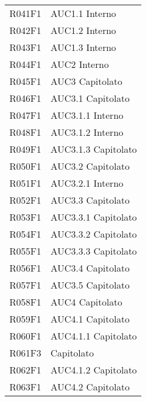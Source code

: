 \documentclass[../analisi-dei-requisiti.tex]{subfiles}
\begin{document}
\begin{longtable}[H]{ p{3cm} | p{4cm} }
  R041F1                               & AUC1.1 Interno                \\
  R042F1                               & AUC1.2 Interno                \\
  R043F1                               & AUC1.3 Interno                \\
  R044F1                               & AUC2 Interno                  \\
  R045F1                               & AUC3 Capitolato               \\
  R046F1                               & AUC3.1 Capitolato             \\
  R047F1                               & AUC3.1.1 Interno              \\
  R048F1                               & AUC3.1.2 Interno              \\
  R049F1                               & AUC3.1.3 Capitolato           \\
  R050F1                               & AUC3.2 Capitolato             \\
  R051F1                               & AUC3.2.1 Interno              \\
  R052F1                               & AUC3.3 Capitolato             \\
  R053F1                               & AUC3.3.1 Capitolato           \\
  R054F1                               & AUC3.3.2 Capitolato           \\
  R055F1                               & AUC3.3.3 Capitolato           \\
  R056F1                               & AUC3.4 Capitolato             \\
  R057F1                               & AUC3.5 Capitolato             \\
  R058F1                               & AUC4 Capitolato               \\
  R059F1                               & AUC4.1 Capitolato             \\
  R060F1                               & AUC4.1.1 Capitolato           \\
  R061F3                               & Capitolato                    \\
  R062F1                               & AUC4.1.2 Capitolato           \\
  R063F1                               & AUC4.2 Capitolato             \\

\end{longtable}
\end{document}
